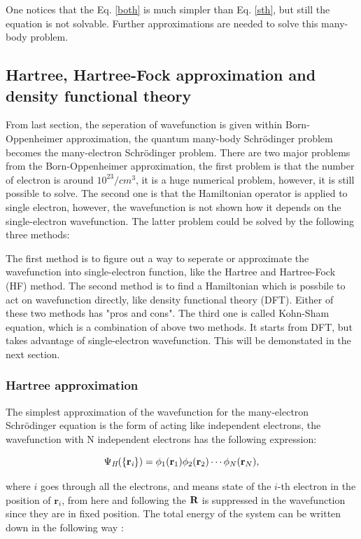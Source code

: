 \documentclass[a4paper, 12pt, titlepage,oneside,drop]{kthesis}
\begin{document}
One notices that the Eq. \ref{both} is much simpler than Eq. \ref{sth}, but still the equation is not solvable. Further approximations  are needed
to solve this many-body problem.

\subsection{Hartree, Hartree-Fock approximation and density functional theory}

From last section, the seperation of wavefunction is given within Born-Oppenheimer approximation, the quantum many-body Schrödinger problem becomes the many-electron 
Schrödinger problem. There are two major problems from the Born-Oppenheimer approximation, the first problem is that the number of electron is around $10^{23}/cm^3$, it is a huge numerical problem, however, it is still possible to solve.
The second one is that the Hamiltonian operator is applied to single electron, however, the wavefunction is not shown how it depends on the single-electron wavefunction. The latter problem 
could be solved by the following three methods:

The first method is to figure out a way to seperate or approximate the wavefunction into single-electron function, like the Hartree and Hartree-Fock (HF) method. The second method is to
find a Hamiltonian which is possbile to act on wavefunction directly, like density functional theory (DFT). Either of these two methods has "pros and cons". The third one is called Kohn-Sham equation,
which is a combination of above two methods. It starts from DFT, but takes advantage of single-electron wavefunction. This will be demonstated in the next section.

\subsubsection{Hartree approximation}
\label{ha}
The simplest approximation of the wavefunction for the many-electron Schrödinger equation is the form of acting like independent
electrons, the wavefunction with N independent electrons has the following expression:

\begin{equation}\label{wfh}
\wfh = \bwf<1><1> \bwf<2><2> \cdots \bwf<N><N>, 
\end{equation}

where $i$ goes through all the electrons, and  means state of the $i$-th electron in the position of ${\textbf{r}}_{\textit{i}}$, 
from here and following the $\textbf R$ is suppressed in the wavefunction since they are in fixed position. The total energy of the system can be written down 
in the following way :
\end{document}
